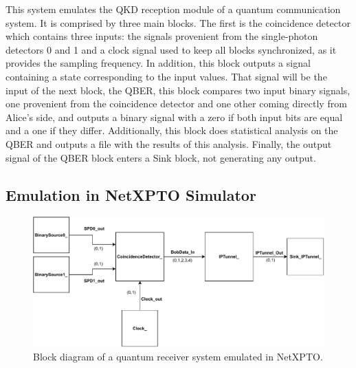 \begin{refsection}
This system emulates the QKD reception module of a quantum communication system. It is comprised by three main blocks. The first is the coincidence detector  which contains three inputs: the signals provenient from the single-photon detectors 0 and 1 and a clock signal used to keep all blocks synchronized, as it provides the sampling frequency. In addition, this block outputs a signal containing a state corresponding to the input values. That signal will be the input of the next block, the QBER, this block compares two input binary signals, one provenient from the coincidence detector and one other coming directly from Alice's side, and outputs a binary signal with a zero if both input bits are equal and a one if they differ. Additionally, this block does statistical analysis on the QBER and outputs a file with the results of this analysis. Finally, the output signal of the QBER block enters a Sink block, not generating any output. 

\subsection{Emulation in NetXPTO Simulator}

\vspace{11pt}

\begin{figure}[H]
	\centering
	\includegraphics[width=0.9\linewidth]{./sdf/arduino_quantum_rx/figures/NetXPTO_implementation.pdf}
	\caption{Block diagram of a quantum receiver system emulated in NetXPTO.}
	\label{fig:netxpto}
\end{figure}


\end{refsection}

